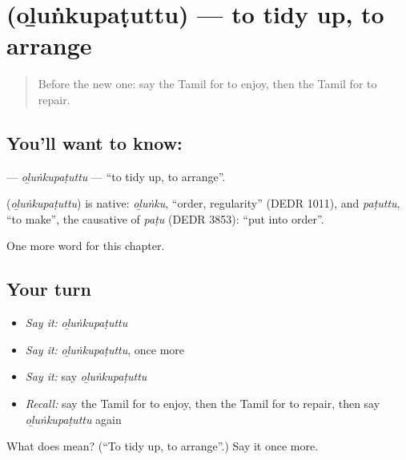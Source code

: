 \section[\texorpdfstring{\ta{ஒழுங்குபடுத்து} (oḻuṅkupaṭuttu)}{ஒழுங்குபடுத்து (oḻuṅkupaṭuttu)}]{ (oḻuṅkupaṭuttu) — to tidy up, to arrange}

\label{lesson:TA-C259-olunkupatuttu}



\begin{quote}
Before the new one: say the Tamil for to enjoy, then the Tamil for to repair.
\end{quote}

\subsection*{You'll want to know: }
\textbf{} — \emph{oḻuṅkupaṭuttu} — \textquotedblleft{}to tidy up, to arrange\textquotedblright{}.

\begin{cousinweb}
\textbf{} (\emph{oḻuṅkupaṭuttu}) is native: \emph{oḻuṅku}, \textquotedblleft{}order, regularity\textquotedblright{} (DEDR 1011), and \emph{paṭuttu}, \textquotedblleft{}to make\textquotedblright{}, the causative of \emph{paṭu} (DEDR 3853): \textquotedblleft{}put into order\textquotedblright{}.
\end{cousinweb}

\begin{grammarlens}[title={What you've built}]
One more word for this chapter.
\end{grammarlens}

\subsection*{Your turn}
\begin{itemize}
\raggedright
  \item \emph{Say it:} \emph{oḻuṅkupaṭuttu}
  \item \emph{Say it:} \emph{oḻuṅkupaṭuttu}, once more
  \item \emph{Say it:} say \emph{oḻuṅkupaṭuttu}
  \item \emph{Recall:} say the Tamil for to enjoy, then the Tamil for to repair, then say \emph{oḻuṅkupaṭuttu} again
\end{itemize}

\begin{tcolorbox}[breakable,colback=teal!4,colframe=teal!35!black,title={Before you move on}]
What does  mean? (\textquotedblleft{}To tidy up, to arrange\textquotedblright{}.) Say it once more.
\end{tcolorbox}
